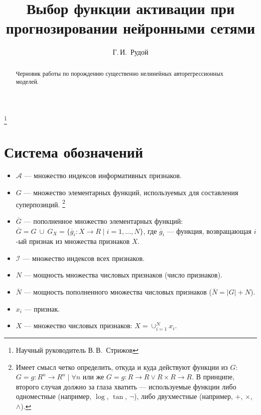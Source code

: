 \documentclass[12pt,a4paper]{amsart}
\begin{document}
\pagestyle{plain}

\title{Выбор функции активации при прогнозировании нейронными сетями}
\author{Г.\,И.~Рудой}
\address{Московский физико-технический институт, ФУПМ, каф. <<Интеллектуальные системы>>}
\thanks{Научный руководитель В.\,В.~Стрижов}

\begin{abstract}
  Черновик работы по порождению существенно нелинейных авторегрессионных моделей.
\end{abstract}

\maketitle

\section{Система обозначений}

\begin{itemize}
  \item $ \mathcal{A} $ --- множество индексов информативных признаков.
  \item $ G $ --- множество элементарных функций, используемых для составления суперпозиций.
	\footnote{Имеет смысл четко определить, откуда и куда действуют функции из $G$: $G = { g : R^n \to R^n \mid \forall n }$
		или же $ G = { g : R \to R \lor R \times R \to R} $. В принципе, второго случая должно за глаза хватить ---
		используемые функции либо одноместные (например, $\log$, $\tan$, $\neg$), либо двухместные (например, $+$, $\times$, $\land$).}
  \item $ \overline{G} $ --- пополненное множество элементарных функций:
	$ \overline{G} = G\ \cup\ G_X = \{ \overline{g}_i : X \to R \mid i = 1, \dots, N\} $,
	где $\overline{g}_i$ --- функция, возвращающая $i$-ый признак из множества признаков $X$.
  \item $ \mathcal{I} $ --- множество индексов всех признаков.
  \item $ N $ --- мощность множества числовых признаков (число признаков).
  \item $ \overline{N} $ --- мощность пополненного множества числовых признаков ($\overline{N} = |G| + N$).
  \item $ x_i $ --- признак.
  \item $ X $ --- множество числовых признаков: $ X = \cup_{i = 1}^N {x_i}$.
\end{itemize}
\end{document}
